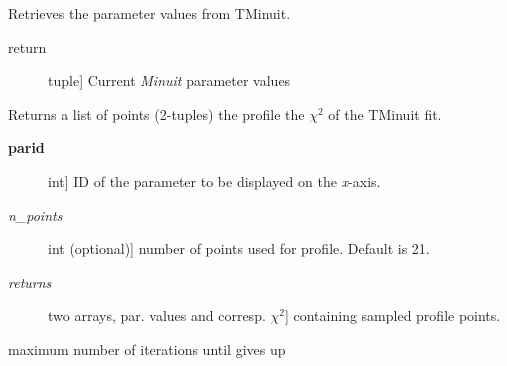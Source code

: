 \documentclass[a4paper,10pt,english]{sphinxmanual}
\begin{document}
\begin{fulllineitems}
\begin{fulllineitems}
\begin{description}
\end{description}

\end{fulllineitems}


\begin{fulllineitems}
\label{module_doc:kafe.minuit.Minuit.get_parameter_values}
Retrieves the parameter values from TMinuit.
\begin{description}
\item[{return}] \leavevmode{[}tuple{]}
Current \emph{Minuit} parameter values

\end{description}

\end{fulllineitems}


\begin{fulllineitems}
\label{module_doc:kafe.minuit.Minuit.get_profile}
Returns a list of points (2-tuples) the profile
the \(\chi^2\)  of the TMinuit fit.
\begin{description}
\item[{\textbf{parid}}] \leavevmode{[}int{]}
ID of the parameter to be displayed on the \emph{x}-axis.

\item[{\emph{n\_points}}] \leavevmode{[}int (optional){]}
number of points used for profile. Default is 21.

\item[{\emph{returns}}] \leavevmode{[}two arrays, par. values and corresp. \(\chi^2\){]}
containing  sampled profile points.

\end{description}

\end{fulllineitems}


\begin{fulllineitems}
\label{module_doc:kafe.minuit.Minuit.max_iterations}
maximum number of iterations until  gives up

\end{fulllineitems}


\end{fulllineitems}
\end{document}
